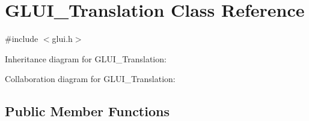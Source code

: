 \hypertarget{class_g_l_u_i___translation}{\section{G\+L\+U\+I\+\_\+\+Translation Class Reference}
\label{class_g_l_u_i___translation}
}


{\ttfamily \#include $<$glui.\+h$>$}



Inheritance diagram for G\+L\+U\+I\+\_\+\+Translation\+:


Collaboration diagram for G\+L\+U\+I\+\_\+\+Translation\+:
\subsection*{Public Member Functions}
